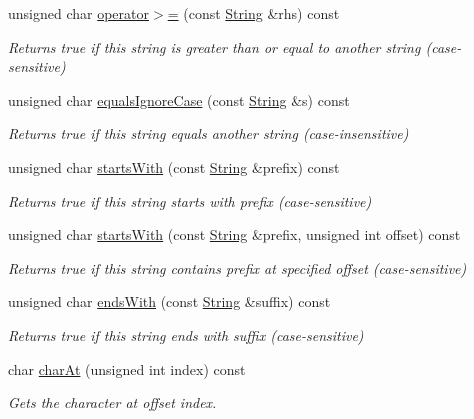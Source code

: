 \begin{DoxyCompactItemize}
unsigned char \hyperlink{class_string_ad55ec344221bba8a7447226bde7b00dc}{operator$>$=} (const \hyperlink{class_string}{String} \&rhs) const
\begin{DoxyCompactList}\small\item\em Returns true if this string is greater than or equal to another string (case-\/sensitive) \end{DoxyCompactList}\item 
unsigned char \hyperlink{class_string_a3b8832687edda189ae43632d70157b94}{equals\+Ignore\+Case} (const \hyperlink{class_string}{String} \&s) const
\begin{DoxyCompactList}\small\item\em Returns true if this string equals another string (case-\/insensitive) \end{DoxyCompactList}\item 
unsigned char \hyperlink{class_string_aa63267cdf821b619ffb0a103510ae6ff}{starts\+With} (const \hyperlink{class_string}{String} \&prefix) const
\begin{DoxyCompactList}\small\item\em Returns true if this string starts with prefix (case-\/sensitive) \end{DoxyCompactList}\item 
unsigned char \hyperlink{class_string_a2ea4d98b45263f59c9eb1f842b04b3af}{starts\+With} (const \hyperlink{class_string}{String} \&prefix, unsigned int offset) const
\begin{DoxyCompactList}\small\item\em Returns true if this string contains prefix at specified offset (case-\/sensitive) \end{DoxyCompactList}\item 
unsigned char \hyperlink{class_string_af96a205cd68121b2fbdf01f5e9b9bb31}{ends\+With} (const \hyperlink{class_string}{String} \&suffix) const
\begin{DoxyCompactList}\small\item\em Returns true if this string ends with suffix (case-\/sensitive) \end{DoxyCompactList}\item 
char \hyperlink{class_string_aee512943b0a68596e1f946fcfda757af}{char\+At} (unsigned int index) const
\begin{DoxyCompactList}\small\item\em Gets the character at offset index. \end{DoxyCompactList}\item 

\end{DoxyCompactItemize}

